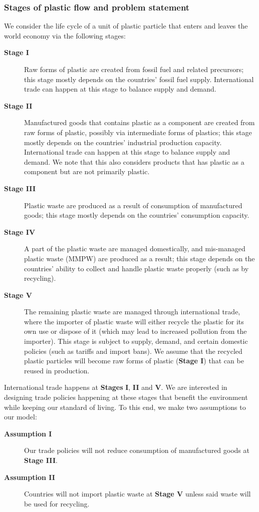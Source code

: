 \subsubsection{Stages of plastic flow and problem statement}
We consider the life cycle of a unit of plastic particle that enters and leaves the world economy via the following stages:
\begin{description}
    \item [\textbf{Stage I}] Raw forms of plastic are created from fossil fuel and related precursors; this stage mostly depends on the countries' fossil fuel supply. International trade can happen at this stage to balance supply and demand.
    \item [\textbf{Stage II}] Manufactured goods that contains plastic as a component are created from raw forms of plastic, possibly via intermediate forms of plastics; this stage mostly depends on the countries' industrial production capacity. International trade can happen at this stage to balance supply and demand. We note that this also considers products that has plastic as a component but are not primarily plastic. 
    \item [\textbf{Stage III}]
    Plastic waste are produced as a result of consumption of manufactured goods; this stage mostly depends on the countries' consumption capacity.
    \item [\textbf{Stage IV}]
    A part of the plastic waste are managed domestically, and mis-managed plastic waste (MMPW) are produced as a result; this stage depends on the countries' ability to collect and handle plastic waste properly (such as by recycling).
    \item [\textbf{Stage V}] The remaining plastic waste are managed through international trade, where the importer of plastic waste will either recycle the plastic for its own use or dispose of it (which may lead to increased pollution from the importer). This stage is subject to supply, demand, and certain domestic policies (such as tariffs and import bans). We assume that the recycled plastic particles will become raw forms of plastic (\textbf{Stage I}) that can be reused in production.
\end{description}
International trade happens at \textbf{Stages} \textbf{I}, \textbf{II} and \textbf{V}. We are interested in designing trade policies happening at these stages that benefit the environment while keeping our standard of living. 
To this end, we make two assumptions to our model: 
\begin{description}
    \item[\textbf{Assumption I}] Our trade policies will not reduce consumption of manufactured goods at \textbf{Stage III}.  
    \item[\textbf{Assumption II}] Countries will not import plastic waste at \textbf{Stage V} unless said waste will be used for recycling.
\end{description}

